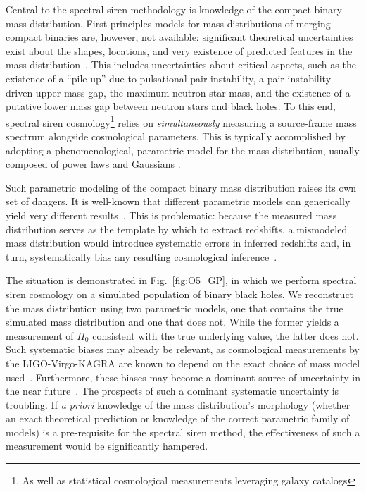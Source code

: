 \documentclass[preprint2,linenumbers]{aastex631}
\begin{document}
Central to the spectral siren methodology is knowledge of the compact binary mass distribution.
First principles models for mass distributions of merging compact binaries are, however, not available: significant theoretical uncertainties exist about the shapes, locations, and very existence of predicted features in the mass distribution~\citep[e.g.][]{ zevin_constraining_2017, mapelli_binary_2020,2021ApJ...910..152Z,marchant_evolution_2023}.
This includes uncertainties about critical aspects, such as the existence of a ``pile-up'' due to pulsational-pair instability, a pair-instability-driven upper mass gap, the maximum neutron star mass, and the existence of a putative lower mass gap between neutron stars and black holes.
To this end, spectral siren cosmology\footnote{As well as statistical cosmological measurements leveraging galaxy catalogs} relies on \textit{simultaneously} measuring a source-frame mass spectrum alongside cosmological parameters.
This is typically accomplished by adopting a phenomenological, parametric model for the mass distribution, usually composed of power laws and Gaussians \citep[e.g.][]{gwtc3_cosmo}.

Such parametric modeling of the compact binary mass distribution raises its own set of dangers.
It is well-known that different parametric models can generically yield very different results~\citep{abbott_population_2021,abbott_population_2023}.
This is problematic: because the measured mass distribution serves as the template by which to extract redshifts, a mismodeled mass distribution would introduce systematic errors in inferred redshifts and, in turn, systematically bias any resulting cosmological inference~\citep{ezquiaga_spectral_2022,Mukherjee:2021rtw,mastrogiovanni_importance_2021,pierra_study_2023}.

The situation is demonstrated in Fig.~\ref{fig:O5_GP}, in which we perform spectral siren cosmology on a simulated population of binary black holes.
We reconstruct the mass distribution using two parametric models, one that contains the true simulated mass distribution and one that does not.
While the former yields a measurement of $H_0$ consistent with the true underlying value, the latter does not.
Such systematic biases may already be relevant, as cosmological measurements by the LIGO-Virgo-KAGRA are known to depend on the exact choice of mass model used~\citep{gwtc3_cosmo}.
Furthermore, these biases may become a dominant source of uncertainty in the near future~\citep{pierra_study_2023}.
The prospects of such a dominant systematic uncertainty is troubling.
If \emph{a priori}\/ knowledge of the mass distribution's morphology (whether an exact theoretical prediction or  knowledge of the correct parametric family of models) is a pre-requisite for the spectral siren method, the effectiveness of such a measurement would be significantly hampered.
\end{document}
